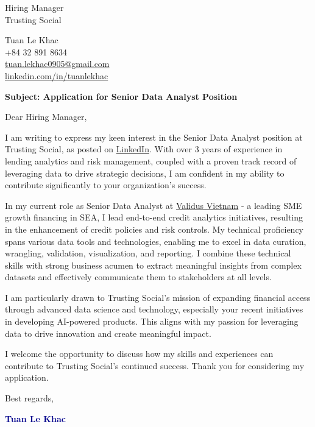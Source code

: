 \documentclass[11pt, letterpaper]{article}
\begin{document}
\thispagestyle{empty}

\noindent
\parbox[t]{0.45\textwidth}{\begin{flushleft}
Hiring Manager \\
Trusting Social
\end{flushleft}}
\hfill
\parbox[t]{0.45\textwidth}{\begin{flushright}
Tuan Le Khac \\
+84 32 891 8634 \\
\href{mailto:tuan.lekhac0905@gmail.com}{tuan.lekhac0905@gmail.com} \\
\href{https://linkedin.com/in/tuanlekhac}{linkedin.com/in/tuanlekhac}
\end{flushright}}


\noindent
\textbf{Subject: Application for Senior Data Analyst Position}

\vspace{0.2in}

Dear Hiring Manager,

\vspace{0.1in}
I am writing to express my keen interest in the Senior Data Analyst position at Trusting Social, as posted on \href{https://www.linkedin.com/jobs/view/4107882329}{LinkedIn}. With over 3 years of experience in lending analytics and risk management, coupled with a proven track record of leveraging data to drive strategic decisions, I am confident in my ability to contribute significantly to your organization's success.

\vspace{0.1in}

In my current role as Senior Data Analyst at \href{https://validus.vn/en/about-validus/}{Validus Vietnam} - a leading SME growth financing in SEA, I lead end-to-end credit analytics initiatives, resulting in the enhancement of credit policies and risk controls. My technical proficiency spans various data tools and technologies, enabling me to excel in data curation, wrangling, validation, visualization, and reporting. I combine these technical skills with strong business acumen to extract meaningful insights from complex datasets and effectively communicate them to stakeholders at all levels.

\vspace{0.1in}

I am particularly drawn to Trusting Social's mission of expanding financial access through advanced data science and technology, especially your recent initiatives in developing AI-powered products. This aligns with my passion for leveraging data to drive innovation and create meaningful impact.
\vspace{0.1in}

I welcome the opportunity to discuss how my skills and experiences can contribute to Trusting Social's continued success. Thank you for considering my application.

\vspace{0.2in}

\noindent
Best regards,
\vspace{0.1in}

\noindent
\textbf{\textcolor{darkblue}{Tuan Le Khac}}
\end{document}
